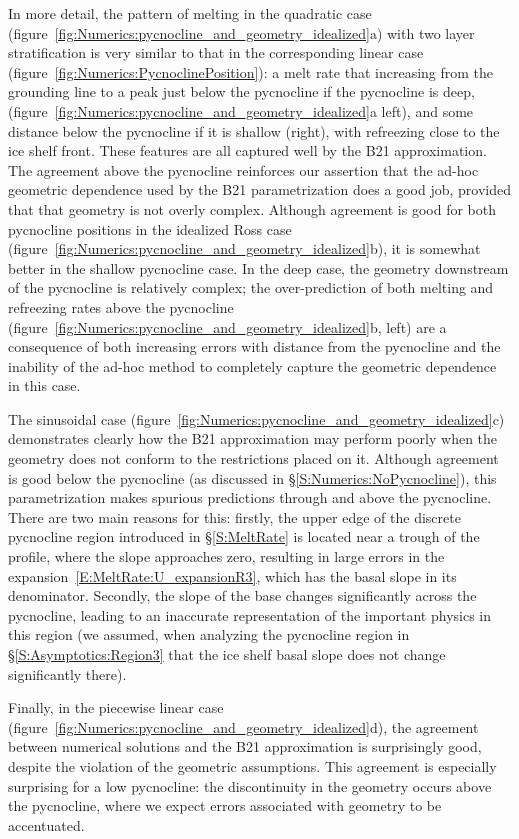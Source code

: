 \documentclass{jfm}
\begin{document}
In more detail, the pattern of melting in the quadratic case (figure~\ref{fig:Numerics:pycnocline_and_geometry_idealized}a) with two layer stratification is very similar to that in the corresponding linear case (figure~\ref{fig:Numerics:PycnoclinePosition}): a melt rate that increasing from the grounding line to a peak just below the pycnocline if the pycnocline is deep, (figure~\ref{fig:Numerics:pycnocline_and_geometry_idealized}a left), and some distance below the pycnocline if it is shallow (right), with refreezing close to the ice shelf front. These features are all captured well by the B21 approximation. The agreement above the pycnocline reinforces our assertion that the ad-hoc geometric dependence used by the B21 parametrization does a good job, provided that that geometry is not overly complex.
Although agreement is good for both pycnocline positions in the idealized Ross case (figure~\ref{fig:Numerics:pycnocline_and_geometry_idealized}b), it is somewhat better in the shallow pycnocline case. In the deep case, the geometry downstream of the pycnocline is relatively complex; the over-prediction of both melting and refreezing rates above the pycnocline (figure~\ref{fig:Numerics:pycnocline_and_geometry_idealized}b, left) are a consequence of both increasing errors with distance from the pycnocline and the inability of the ad-hoc method to completely capture the geometric dependence in this case. 

The sinusoidal case (figure~\ref{fig:Numerics:pycnocline_and_geometry_idealized}c) demonstrates clearly how the B21 approximation may perform poorly when the geometry does not conform to the restrictions placed on it. Although agreement is good below the pycnocline (as discussed in \S\ref{S:Numerics:NoPycnocline}), this parametrization makes spurious predictions through and above the pycnocline. There are two main reasons for this: firstly, the upper edge of the discrete pycnocline region introduced in \S\ref{S:MeltRate} is located near a trough of the profile, where the slope approaches zero, resulting in large errors in the expansion~\eqref{E:MeltRate:U_expansionR3}, which has the basal slope in its denominator.  Secondly, the slope of the base changes significantly across the pycnocline, leading to an inaccurate representation of the important physics in this region (we assumed, when analyzing the pycnocline region in \S\ref{S:Asymptotics:Region3} that the ice shelf basal slope does not change significantly there).

Finally, in the piecewise linear case (figure~\ref{fig:Numerics:pycnocline_and_geometry_idealized}d), the agreement between numerical solutions and the B21 approximation is surprisingly good, despite the violation of the geometric assumptions. This agreement is especially surprising for a low pycnocline: the discontinuity in the geometry occurs above the pycnocline, where we expect errors associated with geometry to be accentuated. 
\end{document}
